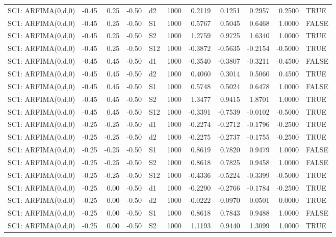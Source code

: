 \begin{table}[ht]
\begin{tabular}{lrrrlrrrrrl}
  SC1: ARFIMA(0,d,0) & -0.45 & 0.25 & -0.50 & d2 & 1000 & 0.2119 & 0.1251 & 0.2957 & 0.2500 & TRUE \\ 
  SC1: ARFIMA(0,d,0) & -0.45 & 0.25 & -0.50 & S1 & 1000 & 0.5767 & 0.5045 & 0.6468 & 1.0000 & FALSE \\ 
  SC1: ARFIMA(0,d,0) & -0.45 & 0.25 & -0.50 & S2 & 1000 & 1.2759 & 0.9725 & 1.6340 & 1.0000 & TRUE \\ 
  SC1: ARFIMA(0,d,0) & -0.45 & 0.25 & -0.50 & S12 & 1000 & -0.3872 & -0.5635 & -0.2154 & -0.5000 & TRUE \\ 
  SC1: ARFIMA(0,d,0) & -0.45 & 0.45 & -0.50 & d1 & 1000 & -0.3540 & -0.3807 & -0.3211 & -0.4500 & FALSE \\ 
  SC1: ARFIMA(0,d,0) & -0.45 & 0.45 & -0.50 & d2 & 1000 & 0.4060 & 0.3014 & 0.5060 & 0.4500 & TRUE \\ 
  SC1: ARFIMA(0,d,0) & -0.45 & 0.45 & -0.50 & S1 & 1000 & 0.5748 & 0.5024 & 0.6478 & 1.0000 & FALSE \\ 
  SC1: ARFIMA(0,d,0) & -0.45 & 0.45 & -0.50 & S2 & 1000 & 1.3477 & 0.9415 & 1.8701 & 1.0000 & TRUE \\ 
  SC1: ARFIMA(0,d,0) & -0.45 & 0.45 & -0.50 & S12 & 1000 & -0.3391 & -0.7539 & -0.0102 & -0.5000 & TRUE \\ 
  SC1: ARFIMA(0,d,0) & -0.25 & -0.25 & -0.50 & d1 & 1000 & -0.2274 & -0.2712 & -0.1796 & -0.2500 & TRUE \\ 
  SC1: ARFIMA(0,d,0) & -0.25 & -0.25 & -0.50 & d2 & 1000 & -0.2275 & -0.2737 & -0.1755 & -0.2500 & TRUE \\ 
  SC1: ARFIMA(0,d,0) & -0.25 & -0.25 & -0.50 & S1 & 1000 & 0.8619 & 0.7820 & 0.9479 & 1.0000 & FALSE \\ 
  SC1: ARFIMA(0,d,0) & -0.25 & -0.25 & -0.50 & S2 & 1000 & 0.8618 & 0.7825 & 0.9458 & 1.0000 & FALSE \\ 
  SC1: ARFIMA(0,d,0) & -0.25 & -0.25 & -0.50 & S12 & 1000 & -0.4336 & -0.5224 & -0.3399 & -0.5000 & TRUE \\ 
  SC1: ARFIMA(0,d,0) & -0.25 & 0.00 & -0.50 & d1 & 1000 & -0.2290 & -0.2766 & -0.1784 & -0.2500 & TRUE \\ 
  SC1: ARFIMA(0,d,0) & -0.25 & 0.00 & -0.50 & d2 & 1000 & -0.0222 & -0.0970 & 0.0501 & 0.0000 & TRUE \\ 
  SC1: ARFIMA(0,d,0) & -0.25 & 0.00 & -0.50 & S1 & 1000 & 0.8618 & 0.7843 & 0.9488 & 1.0000 & FALSE \\ 
  SC1: ARFIMA(0,d,0) & -0.25 & 0.00 & -0.50 & S2 & 1000 & 1.1193 & 0.9440 & 1.3099 & 1.0000 & TRUE \\ 

\end{tabular}
\end{table}
